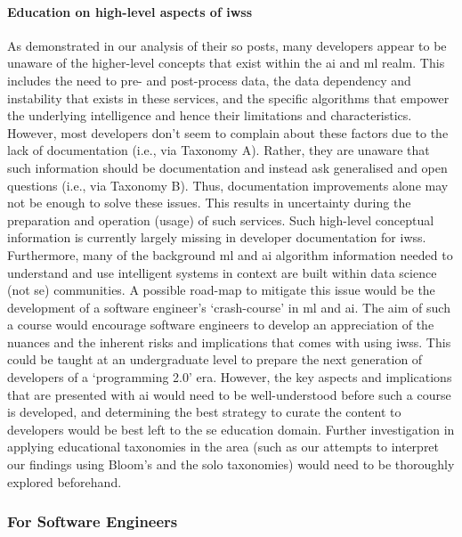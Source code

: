 \paragraph{Education on high-level aspects of \glspl{iws}} As demonstrated in our analysis of their \gls{so} posts, many developers appear to be unaware of the higher-level concepts that exist within the \gls{ai} and \gls{ml} realm. This includes the need to pre- and post-process data, the data dependency and instability that exists in these services, and the specific algorithms that empower the underlying intelligence and hence their limitations and characteristics. However, most developers don't seem to complain about these factors due to the lack of documentation (i.e., via Taxonomy A). Rather, they are unaware that such information should be documentation and instead ask generalised and open questions (i.e., via Taxonomy B). Thus, documentation improvements alone may not be enough to solve these issues. This results in uncertainty during the preparation and operation (usage) of such services.  Such high-level conceptual information is currently largely missing in developer documentation for \glspl{iws}. Furthermore, many of the background \gls{ml} and \gls{ai} algorithm information needed to understand and use intelligent systems in context are built within data science (not \gls{se}) communities. A possible road-map to mitigate this issue would be the development of a software engineer's `crash-course' in \gls{ml} and \gls{ai}. The aim of such a course would encourage software engineers to develop an appreciation of the nuances and the inherent risks and implications that comes with using \glspl{iws}. This could be taught at an undergraduate level to prepare the next generation of developers of a `programming 2.0' era. However, the key aspects and implications that are presented with \gls{ai} would need to be well-understood before such a course is developed, and determining the best strategy to curate the content to developers would be best left to the \gls{se} education domain. Further investigation in applying educational taxonomies in the area (such as our attempts to interpret our findings using Bloom's and the \gls{solo} taxonomies) would need to be thoroughly explored beforehand.

\subsubsection{For Software Engineers}

